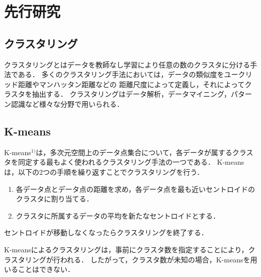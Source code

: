 \section{先行研究}

\subsection{クラスタリング}
クラスタリングとはデータを教師なし学習により任意の数のクラスタに分ける手法である．
多くのクラスタリング手法においては，データの類似度をユークリッド距離やマンハッタン距離などの
距離尺度によって定義し，それによってクラスタを抽出する．
クラスタリングはデータ解析，データマイニング，パターン認識など様々な分野で用いられる．

\subsection{K-means}
K-means$^{1)}$は，多次元空間上のデータ点集合について，各データが属するクラスタを同定する最もよく使われるクラスタリング手法の一つである．
K-meansは，以下の2つの手順を繰り返すことでクラスタリングを行う．
\begin{enumerate}
  \item 各データ点とデータ点の距離を求め，各データ点を最も近いセントロイドのクラスタに割り当てる．
  \item クラスタに所属するデータの平均を新たなセントロイドとする．
\end{enumerate}
セントロイドが移動しなくなったらクラスタリングを終了する．

% 
% 

K-meansによるクラスタリングは，事前にクラスタ数を指定することにより，クラスタリングが行われる．
したがって，クラスタ数が未知の場合，K-meansを用いることはできない．


